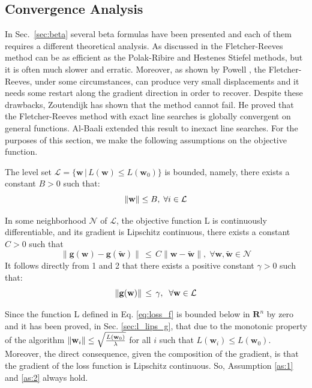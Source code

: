 \subsection{Convergence Analysis}\label{global_convergence}
In Sec.~\ref{sec:beta} several beta formulas have been presented and each of them requires a different theoretical analysis. As discussed in \cite{nocedal_global_convergence} the Fletcher-Reeves \cite{Fletcher1964} method can be as efficient as the Polak-Ribire and Hestenes Stiefel methods, but it is often much slower and erratic. Moreover, as shown by Powell \cite{Powell1977}, the Fletcher-Reeves, under some circumstances, can produce very small displacements and it needs some restart along the gradient direction in order to recover. Despite these drawbacks, Zoutendijk
\cite{zoutendijk1970northholland} has shown that the method cannot fail. He proved that the Fletcher-Reeves
method with exact line searches is globally convergent on general functions. Al-Baali \cite{baali} extended this result to inexact line searches. For the purposes of this section, we make the following assumptions on the objective function.
\begin{assumption}
\label{as:1}
The level set $\mathcal{L} = \{ \mathbf{w}\, | \, L(\mathbf{w}) \leq L(\mathbf{w}_0)\}$ is bounded, namely, there exists a constant $B > 0$ such that:
$$ \left\lVert\mathbf{w}\right\rVert \leq B, \; \forall i \in \mathcal{L}$$ 
\end{assumption}
\begin{assumption}
\label{as:2}
    In some neighborhood $\mathcal{N}$ of $\mathcal{L}$, the objective function L is continuously differentiable, and its gradient is Lipschitz continuous, there exists a constant $C > 0$ such that 
    $$
      \|\mathbf{g}(\textbf{w}) - \mathbf{g}(\tilde{\textbf{w}})\| \, \leq \,  C \| \mathbf{w} - \tilde{\mathbf{w}}\|,\; \forall \mathbf{w}, \tilde{\mathbf{w}} \in \mathcal{N}
    $$
    It follows directly from 1 and 2 that there exists a positive constant $\gamma>0$ such that:
    $$\left\lVert\mathbf{g}(\textbf{w})\right\rVert \, \leq\, \gamma, \;\; \forall \mathbf{w} \in \mathcal{L} $$
\end{assumption}
\noindent Since the function L defined in Eq. \ref{eq:loss_f} is bounded below in $\mathbf{R}^n$  by zero and it has been proved, in Sec. \ref{sec:l_lips_g}, that due to the monotonic property of the algorithm $\left\lVert\mathbf{w}_i\right\rVert \leq \sqrt{\frac{L(\mathbf{w}_0)}{\lambda}} $ for all $i$ such that $L(\mathbf{w}_i) \leq L(\mathbf{w}_0)$. Moreover, the direct consequence, given the composition of the gradient, is that the gradient of the loss function is Lipschitz continuous. So, Assumption \ref{as:1} and \ref{as:2} always hold.

